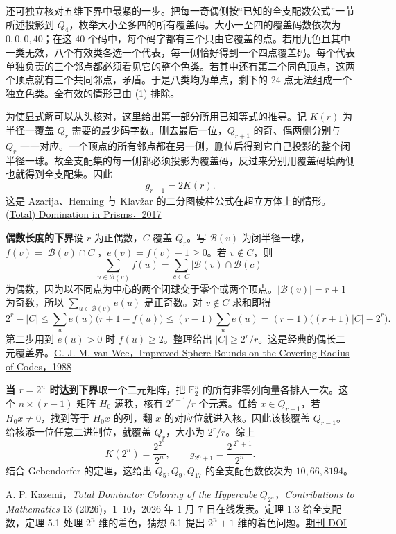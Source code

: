 \documentclass[11pt,a4paper]{article}
\newcommand{\sect}[1]{\par\vspace{4pt}{\large\sffamily\bfseries\color{accent}#1}\par}
\newcommand{\subh}[1]{\par\textbf{#1}\quad}
\newcommand{\F}{\mathbb F}
\newcommand{\B}{\mathcal B}
\begin{document}
还可独立核对五维下界中最紧的一步。把每一奇偶侧按“已知的全支配数公式”一节所述投影到 $Q_4$，枚举大小至多四的所有覆盖码。大小一至四的覆盖码数依次为 $0,0,0,40$；在这 $40$ 个码中，每个码字都有三个只由它覆盖的点。若用九色且其中一类无效，八个有效类各选一个代表，每一侧恰好得到一个四点覆盖码。每个代表单独负责的三个邻点都必须看见它的整个色类。若其中还有第二个同色顶点，这两个顶点就有三个共同邻点，矛盾。于是八类均为单点，剩下的 $24$ 点无法组成一个独立色类。全有效的情形已由 (1) 排除。

\newpage
\sect{已知的全支配数公式}
为使显式解可以从头核对，这里给出第一部分所用已知等式的推导。记 $K(r)$ 为半径一覆盖 $Q_r$ 需要的最少码字数。删去最后一位，$Q_{r+1}$ 的奇、偶两侧分别与 $Q_r$ 一一对应。一个顶点的所有邻点都在另一侧，删位后得到它自己投影的整个闭半径一球。故全支配集的每一侧都必须投影为覆盖码，反过来分别用覆盖码填两侧也就得到全支配集。因此
\[
                        g_{r+1}=2K(r).
\]
这是 Azarija、Henning 与 {\western Klavžar} 的二分图棱柱公式在超立方体上的情形。\href{https://doi.org/10.37236/6288}{(Total) Domination in Prisms，2017}

\subh{偶数长度的下界}设 $r$ 为正偶数，$C$ 覆盖 $Q_r$。写 $\B(v)$ 为闭半径一球，$f(v)=|\B(v)\cap C|$，$e(v)=f(v)-1\ge0$。若 $v\notin C$，则
\[
  \sum_{u\in\B(v)} f(u)=\sum_{c\in C}|\B(v)\cap\B(c)|
\]
为偶数，因为以不同点为中心的两个闭球交于零个或两个顶点。$|\B(v)|=r+1$ 为奇数，所以 $\sum_{u\in\B(v)}e(u)$ 是正奇数。对 $v\notin C$ 求和即得
\[
 2^r-|C|
 \le \sum_u e(u)\bigl(r+1-f(u)\bigr)
 \le (r-1)\sum_u e(u)
 = (r-1)\bigl((r+1)|C|-2^r\bigr).
\]
第二步用到 $e(u)>0$ 时 $f(u)\ge2$。整理给出 $|C|\ge2^r/r$。这是经典的偶长二元覆盖界。\href{https://doi.org/10.1109/18.2632}{G. J. M. van Wee，Improved Sphere Bounds on the Covering Radius of Codes，1988}

\subh{当 $r=2^n$ 时达到下界}取一个二元矩阵，把 $\F_2^n$ 的所有非零列向量各排入一次。这个 $n\times(r-1)$ 矩阵 $H_0$ 满秩，核有 $2^{r-1}/r$ 个元素。任给 $x\in Q_{r-1}$，若 $H_0x\ne0$，找到等于 $H_0x$ 的列，翻 $x$ 的对应位就进入核。因此该核覆盖 $Q_{r-1}$。给核添一位任意二进制位，就覆盖 $Q_r$，大小为 $2^r/r$。综上
\[
            K(2^n)=\frac{2^{2^n}}{2^n},\qquad
            g_{2^n+1}=\frac{2^{\,2^n+1}}{2^n}.
\]
结合 Gebendorfer 的定理，这给出 $Q_5,Q_9,Q_{17}$ 的全支配色数依次为 $10,66,8194$。

\sect{问题出处与研究状态}
A. P. Kazemi，{\western\itshape Total Dominator Coloring of the Hypercube} $Q_{2^n}$，{\western\itshape Contributions to Mathematics} 13 (2026)，1–10，2026 年 1 月 7 日在线发表。定理 1.3 给全支配数，定理 5.1 处理 $2^n$ 维的着色，猜想 6.1 提出 $2^n+1$ 维的着色问题。\href{https://doi.org/10.47443/cm.2025.102}{期刊 DOI}
\end{document}
